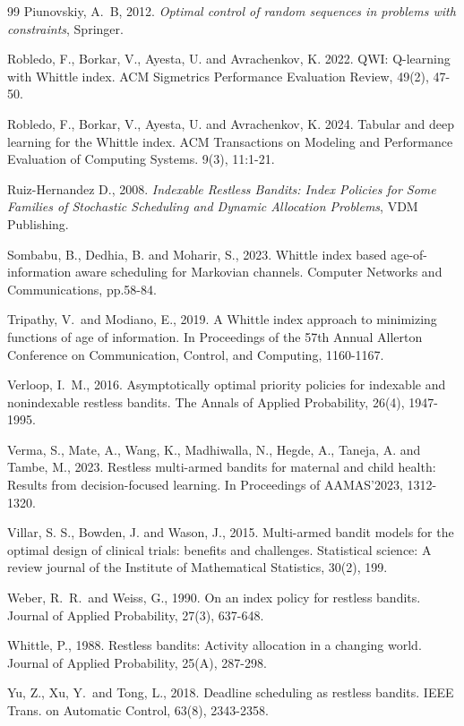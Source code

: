 \documentclass[12pt]{article}
\numberwithin{equation}{section}
\newcommand{\1}{\textbf{1}}
\begin{document}
\begin{thebibliography}{99}
 Piunovskiy, A.\ B, 2012. 
{\it Optimal control of random sequences in problems with constraints}, Springer.  

 Robledo, F., Borkar, V., Ayesta, U. and Avrachenkov, K. 2022.  
QWI: Q-learning with Whittle index. ACM Sigmetrics Performance Evaluation Review, 49(2), 47-50.

 Robledo, F., Borkar, V., Ayesta, U. and Avrachenkov, K. 2024. 
Tabular and deep learning for the Whittle index. 
ACM Transactions on Modeling and Performance Evaluation of Computing Systems.   
9(3), 11:1-21.

 Ruiz-Hernandez D., 2008.
{\it Indexable Restless Bandits: Index Policies for Some Families of Stochastic Scheduling 
and Dynamic Allocation Problems}, VDM Publishing.

 Sombabu, B., Dedhia, B. and Moharir, S., 2023. 
Whittle index based age-of-information aware scheduling for Markovian channels. 
Computer Networks and Communications, pp.58-84.

 Tripathy, V.\ and Modiano, E., 2019. A Whittle index approach to minimizing functions of age of information. In Proceedings of the 57th Annual Allerton Conference on Communication, Control, and Computing, 1160-1167.

 Verloop, I.\ M., 2016. Asymptotically optimal priority policies for indexable and nonindexable restless bandits. The Annals of Applied Probability, 26(4), 1947-1995.

 Verma, S., Mate, A., Wang, K., Madhiwalla, N., Hegde, A., Taneja, A. and Tambe, M., 2023. 
Restless multi-armed bandits for maternal and child health: Results from decision-focused learning. 
In Proceedings of AAMAS'2023, 1312-1320.
    
 Villar, S. S., Bowden, J. and Wason, J., 2015. 
Multi-armed bandit models for the optimal design of clinical trials: benefits and challenges. 
Statistical science: A review journal of the Institute of Mathematical Statistics, 30(2), 199.    

 Weber, R.\ R.\ and Weiss, G., 1990. On an index policy for restless bandits. 
Journal of Applied Probability, 27(3), 637-648.

 Whittle, P., 1988. Restless bandits: Activity allocation in a changing world. 
Journal of Applied Probability, 25(A), 287-298.


 Yu, Z., Xu, Y.\ and Tong, L., 2018. Deadline scheduling as restless bandits. 
IEEE Trans. on Automatic Control, 63(8), 2343-2358.

\end{thebibliography}
\end{document}
